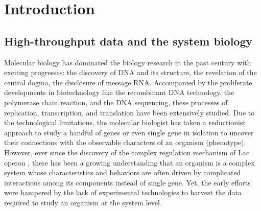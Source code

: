 \chapter{Introduction}\label{ch:introduction}


\instructionsintroduction



\section{High-throughput data and the system biology}

Molecular biology has dominated the biology research in the past century with exciting progresses: the discovery of DNA and its structure, the revelation of the central dogma, the disclosure of message RNA. Accompanied by the proliferate developments in biotechnology like the recombinant DNA technology, the polymerase chain reaction, and the DNA sequencing, these processes of replication, transcription, and translation have been extensively studied. Due to the technological limitations, the molecular biologist has taken a reductionist approach to study a handful of genes or even single gene in isolation to uncover their connections with the observable characters of an organism (phenotype). However, ever since the discovery of the complex regulation mechanism of Lac operon \cite{Jacob1961}, there has been a growing understanding that an organism is a complex system whose characteristics and behaviors are often driven by complicated interactions among its components instead of single gene.  Yet, the early efforts were hampered by the lack of experimental technologies to harvest the data required to study an organism at the system level.


